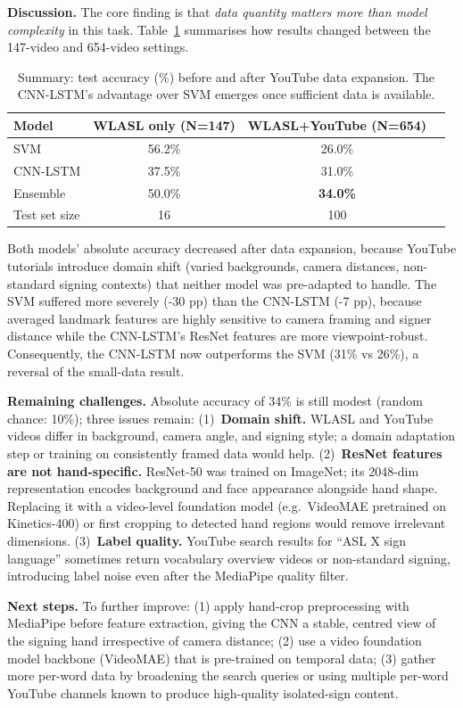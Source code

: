 \documentclass[final]{article}
\begin{document}
\textbf{Discussion.}
The core finding is that \textit{data quantity matters more than model complexity}
in this task. Table~\ref{tab:comparison} summarises how results changed between
the 147-video and 654-video settings.

\begin{table}[h]
  \centering
  \caption{Summary: test accuracy (\%) before and after YouTube data expansion.
           The CNN-LSTM's advantage over SVM emerges once sufficient data is available.}
  \label{tab:comparison}
  \begin{tabular}{lccc}
    \toprule
    \textbf{Model} & \textbf{WLASL only (N=147)} & \textbf{WLASL+YouTube (N=654)} \\
    \midrule
    SVM           & 56.2\%                       & 26.0\%  \\
    CNN-LSTM      & 37.5\%                       & 31.0\%  \\
    Ensemble      & 50.0\%                       & \textbf{34.0\%} \\
    \midrule
    Test set size & 16                           & 100 \\
    \bottomrule
  \end{tabular}
\end{table}

Both models' absolute accuracy decreased after data expansion, because
YouTube tutorials introduce domain shift (varied backgrounds, camera distances,
non-standard signing contexts) that neither model was pre-adapted to handle.
The SVM suffered more severely (-30 pp) than the CNN-LSTM (-7 pp), because
averaged landmark features are highly sensitive to camera framing and signer
distance while the CNN-LSTM's ResNet features are more viewpoint-robust.
Consequently, the CNN-LSTM now outperforms the SVM (31\% vs 26\%), a reversal
of the small-data result.

\textbf{Remaining challenges.}
Absolute accuracy of 34\% is still modest (random chance: 10\%); three issues
remain: (1)~\textbf{Domain shift.}  WLASL and YouTube videos differ in
background, camera angle, and signing style; a domain adaptation step or
training on consistently framed data would help.
(2)~\textbf{ResNet features are not hand-specific.}  ResNet-50 was trained on
ImageNet; its 2048-dim representation encodes background and face appearance
alongside hand shape. Replacing it with a video-level foundation model
(e.g.\ VideoMAE \citep{tong2022videomae} pretrained on Kinetics-400) or
first cropping to detected hand regions would remove irrelevant dimensions.
(3)~\textbf{Label quality.}  YouTube search results for ``ASL X sign language''
sometimes return vocabulary overview videos or non-standard signing, introducing
label noise even after the MediaPipe quality filter.

\textbf{Next steps.}
To further improve: (1) apply hand-crop preprocessing with MediaPipe before
feature extraction, giving the CNN a stable, centred view of the signing hand
irrespective of camera distance; (2) use a video foundation model backbone
(VideoMAE) that is pre-trained on temporal data; (3) gather more per-word
data by broadening the search queries or using multiple per-word YouTube
channels known to produce high-quality isolated-sign content.

\newpage

\end{document}

